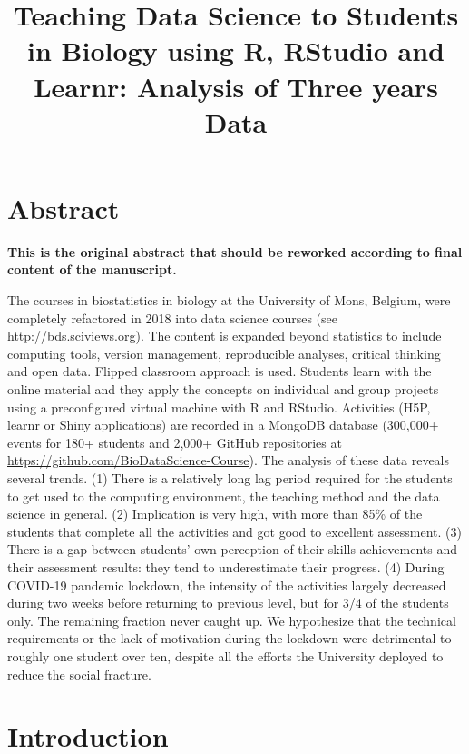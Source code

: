 \documentclass[
]{article}
\title{Teaching Data Science to Students in Biology using R, RStudio and
Learnr: Analysis of Three years Data}
\author{}
\date{\vspace{-2.5em}}
\begin{document}
\maketitle

\hypertarget{abstract}{%
\section{Abstract}\label{abstract}}

\textbf{This is the original abstract that should be reworked according
to final content of the manuscript.}

The courses in biostatistics in biology at the University of Mons,
Belgium, were completely refactored in 2018 into data science courses
(see \url{http://bds.sciviews.org}). The content is expanded beyond
statistics to include computing tools, version management, reproducible
analyses, critical thinking and open data. Flipped classroom approach is
used. Students learn with the online material and they apply the
concepts on individual and group projects using a preconfigured virtual
machine with R and RStudio. Activities (H5P, learnr or Shiny
applications) are recorded in a MongoDB database (300,000+ events for
180+ students and 2,000+ GitHub repositories at
\url{https://github.com/BioDataScience-Course}). The analysis of these
data reveals several trends. (1) There is a relatively long lag period
required for the students to get used to the computing environment, the
teaching method and the data science in general. (2) Implication is very
high, with more than 85\% of the students that complete all the
activities and got good to excellent assessment. (3) There is a gap
between students' own perception of their skills achievements and their
assessment results: they tend to underestimate their progress. (4)
During COVID-19 pandemic lockdown, the intensity of the activities
largely decreased during two weeks before returning to previous level,
but for 3/4 of the students only. The remaining fraction never caught
up. We hypothesize that the technical requirements or the lack of
motivation during the lockdown were detrimental to roughly one student
over ten, despite all the efforts the University deployed to reduce the
social fracture.

\hypertarget{introduction}{%
\section{Introduction}\label{introduction}}
\end{document}
